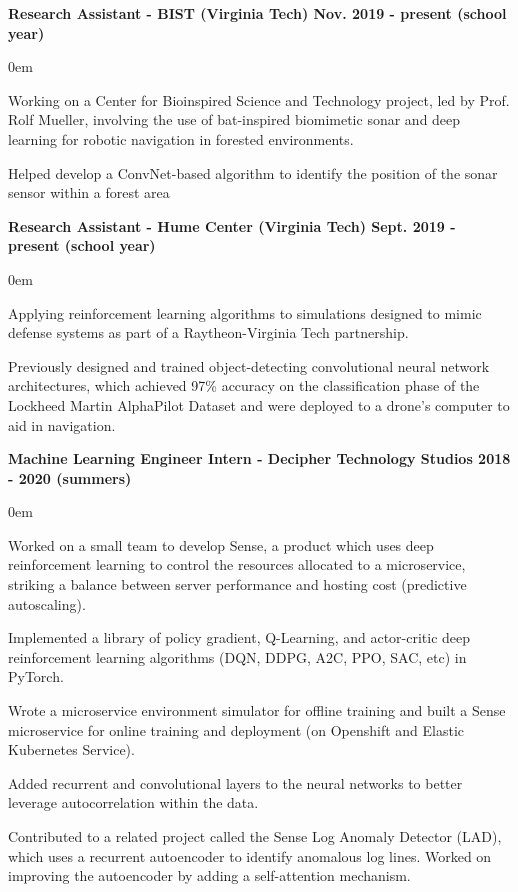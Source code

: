 \documentclass{article}
\begin{document}
\begin{center}
\begin{flushleft}
    \textbf{Research Assistant - BIST (Virginia Tech) \hfill Nov. 2019 - present (school year)}
    \begin{compactitem}
      \itemsep0em
      \item Working on a Center for Bioinspired Science and Technology project, led by Prof. Rolf Mueller, involving the use of bat-inspired biomimetic sonar and deep learning for robotic navigation in forested environments.
      \item Helped develop a ConvNet-based algorithm to identify the position of the sonar sensor within a forest area
    \end{compactitem}

    \textbf{Research Assistant - Hume Center (Virginia Tech) \hfill Sept. 2019 - present (school year)}
    \begin{compactitem}
      \itemsep0em
      \item Applying reinforcement learning algorithms to simulations designed to mimic defense systems as part of a Raytheon-Virginia Tech partnership.
      \item Previously designed and trained object-detecting convolutional neural network architectures, which achieved 97\% accuracy on the classification phase of the Lockheed Martin AlphaPilot Dataset and were deployed to a drone's computer to aid in navigation.
    \end{compactitem}

    \textbf{Machine Learning Engineer Intern - Decipher Technology Studios \hfill 2018 - 2020 (summers)}
    \begin{compactitem}
      \itemsep0em
      \item Worked on a small team to develop Sense, a product which uses deep reinforcement learning to control the resources allocated to a microservice, striking a balance between server performance and hosting cost (predictive autoscaling).
      \item Implemented a library of policy gradient, Q-Learning, and actor-critic deep reinforcement learning algorithms (DQN, DDPG, A2C, PPO, SAC, etc) in PyTorch.
      \item Wrote a microservice environment simulator for offline training and built a Sense microservice for online training and deployment (on Openshift and Elastic Kubernetes Service).
      \item Added recurrent and convolutional layers to the neural networks to better leverage autocorrelation within the data.
      \item Contributed to a related project called the Sense Log Anomaly Detector (LAD), which uses a recurrent autoencoder to identify anomalous log lines. Worked on improving the autoencoder by adding a self-attention mechanism.
    \end{compactitem}



\end{flushleft}
\end{center}
\end{document}
